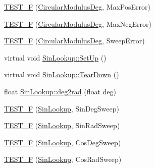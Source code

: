 \begin{DoxyCompactItemize}
\item 
\hyperlink{group___unit_tests_gab74bc4a71915e6b66efa543d8162af35}{\-T\-E\-S\-T\-\_\-\-F} (\hyperlink{class_circular_modulus_deg}{\-Circular\-Modulus\-Deg}, \-Max\-Pos\-Error)
\item 
\hyperlink{group___unit_tests_ga399c1468b3de50cedea1c29e281f0387}{\-T\-E\-S\-T\-\_\-\-F} (\hyperlink{class_circular_modulus_deg}{\-Circular\-Modulus\-Deg}, \-Max\-Neg\-Error)
\item 
\hyperlink{group___unit_tests_gae9b10024a005563e17340713ce445a15}{\-T\-E\-S\-T\-\_\-\-F} (\hyperlink{class_circular_modulus_deg}{\-Circular\-Modulus\-Deg}, \-Sweep\-Error)
\item 
virtual void \hyperlink{group___unit_tests_gaf5c7e4b5a50e259ba0c95e5134d66b9b}{\-Sin\-Lookup\-::\-Set\-Up} ()
\item 
virtual void \hyperlink{group___unit_tests_ga93c08f4058ee3f8c7de2ac69b799b386}{\-Sin\-Lookup\-::\-Tear\-Down} ()
\item 
float \hyperlink{group___unit_tests_gab9e378171158291991120fdea72f48f0}{\-Sin\-Lookup\-::deg2rad} (float deg)
\item 
\hyperlink{group___unit_tests_ga0f957c5a6bc6cb673ad664bbdc389721}{\-T\-E\-S\-T\-\_\-\-F} (\hyperlink{class_sin_lookup}{\-Sin\-Lookup}, \-Sin\-Deg\-Sweep)
\item 
\hyperlink{group___unit_tests_ga28cf6df5edd30421eba939fc8b6951d7}{\-T\-E\-S\-T\-\_\-\-F} (\hyperlink{class_sin_lookup}{\-Sin\-Lookup}, \-Sin\-Rad\-Sweep)
\item 
\hyperlink{group___unit_tests_gaf59634da9fe51f87255171f2b26412ff}{\-T\-E\-S\-T\-\_\-\-F} (\hyperlink{class_sin_lookup}{\-Sin\-Lookup}, \-Cos\-Deg\-Sweep)
\item 
\hyperlink{group___unit_tests_gab85081745f2bed950e8b3c8a383711e0}{\-T\-E\-S\-T\-\_\-\-F} (\hyperlink{class_sin_lookup}{\-Sin\-Lookup}, \-Cos\-Rad\-Sweep)
\end{DoxyCompactItemize}
